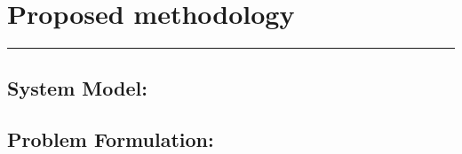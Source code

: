 
\chapter{Proposed methodology}
\noindent \rule{6.6in}{0.01in}

\newpage
\section{System Model:}


\section{Problem Formulation:}
